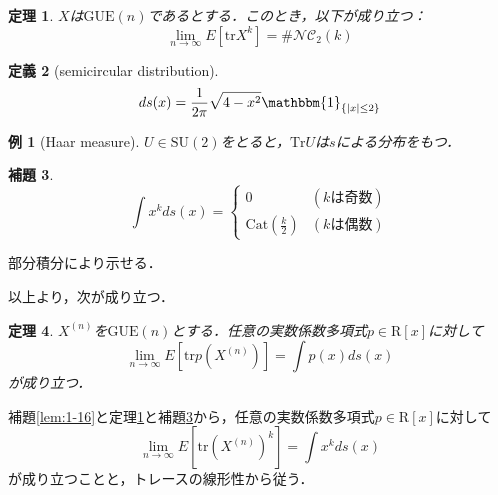 \documentclass{ltjsarticle}
\makeatletter
\theoremstyle{mystyle1}
\newtheorem{dfn}{定義}[section]
\newtheorem{thm}[dfn]{定理}
\newtheorem{lem}[dfn]{補題}
\theoremstyle{mystyle2}
\newtheorem{example}{例}
\theoremstyle{mystyle3}
\renewenvironment{proof}[1][\proofname]{\par
  \pushQED{\qed}%
  \normalfont
  \topsep6\p@\@plus6\p@ \trivlist
  \item[\hskip\labelsep{\bfseries\sffamily #1}]\ignorespaces
}{%
  \popQED\endtrivlist\@endpefalse
}
\renewcommand\proofname{証明}
\makeatother
\begin{document}
\begin{thm}\label{thm:1-17}
    $X$は$\mathrm{GUE}(n)$であるとする．このとき，以下が成り立つ：
    \begin{equation}
        \lim_{n\to\infty}E[\mathrm{tr} X^k]=\#\mathcal{NC}_2(k)
    \end{equation}
\end{thm}

\begin{dfn}[semicircular distribution]
    \begin{equation}
        ds(x)=\frac{1}{2\pi}\sqrt{4-x^2}\mathbbm{1}_{\{|x|\leq2\}}
    \end{equation}
\end{dfn}

\begin{example}[Haar measure]
    $U\in\mathrm{SU}(2)$をとると，$\mathrm{Tr}U$は$s$による分布をもつ．
\end{example}

\begin{lem}\label{lem:1-19}
    \begin{equation}
        \int x^k ds(x)=\begin{cases}
            0                         & (kは奇数) \\
            \mathrm{Cat}(\frac{k}{2}) & (kは偶数)
        \end{cases}
    \end{equation}
\end{lem}

\begin{proof}
    部分積分により示せる．
\end{proof}

以上より，次が成り立つ．

\begin{thm}\label{thm:1-20}
    $X^{(n)}$を$\mathrm{GUE}(n)$とする．任意の実数係数多項式$p\in\mathrm{R}[x]$に対して
    \begin{equation}
        \lim_{n\to\infty}E[\mathrm{tr}p(X^{(n)})]=\int p(x)ds(x)
    \end{equation}
    が成り立つ．
\end{thm}

\begin{proof}
    補題\ref{lem:1-16}と定理\ref{thm:1-17}と補題\ref{lem:1-19}から，任意の実数係数多項式$p\in\mathrm{R}[x]$に対して
    \begin{equation}
        \lim_{n\to\infty}E[\mathrm{tr}(X^{(n)})^k]=\int x^kds(x)
    \end{equation}
    が成り立つことと，トレースの線形性から従う．
\end{proof}
\end{document}
